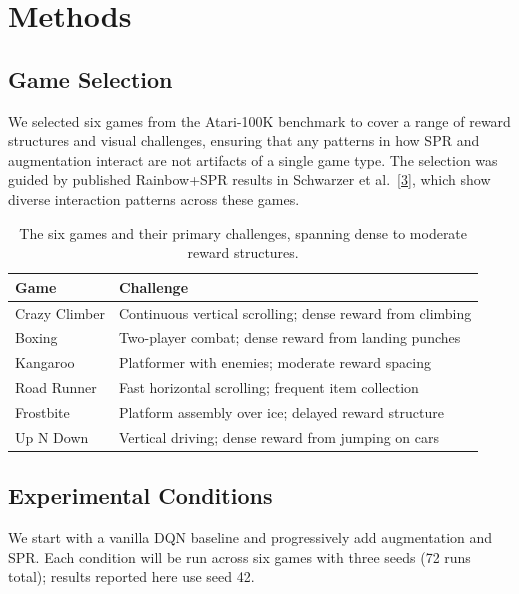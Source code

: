 \documentclass[11pt]{article}
\newcommand{\citelink}[2]{\href{#1}{\small[#2]}}
\begin{document}
\section{Methods}

\subsection{Game Selection}

We selected six games from the Atari-100K benchmark to cover a range of
reward structures and visual challenges, ensuring that any patterns in
how SPR and augmentation interact are not artifacts of a single game
type. The selection was guided by published Rainbow+SPR results in
Schwarzer et al.\ \citelink{https://arxiv.org/abs/2007.05929}{3}, which
show diverse interaction patterns across these games.

\begin{table}[H]
\centering
\renewcommand{\arraystretch}{1.5}
\setlength{\tabcolsep}{10pt}
\begin{tabular}{l l}
\toprule
\textbf{Game} & \textbf{Challenge} \\
\midrule
Crazy Climber & Continuous vertical scrolling; dense reward from climbing \\
Boxing        & Two-player combat; dense reward from landing punches \\
Kangaroo      & Platformer with enemies; moderate reward spacing \\
Road Runner   & Fast horizontal scrolling; frequent item collection \\
Frostbite     & Platform assembly over ice; delayed reward structure \\
Up N Down     & Vertical driving; dense reward from jumping on cars \\
\bottomrule
\end{tabular}
\caption{The six games and their primary challenges, spanning dense
to moderate reward structures.}
\end{table}

\subsection{Experimental Conditions}

We start with a vanilla DQN baseline and progressively add augmentation
and SPR. Each condition will be run across six games with three seeds
(72 runs total); results reported here use seed 42.
\end{document}
